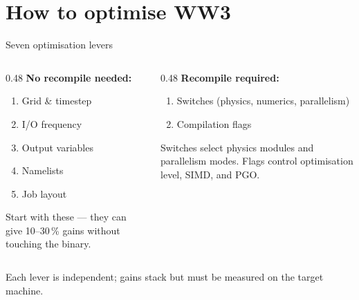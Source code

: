 \documentclass[aspectratio=169,10pt]{beamer}
\begin{document}
\section{How to optimise WW3}

\begin{frame}{Seven optimisation levers}

  \begin{columns}[T]
    \begin{column}{0.48\textwidth}
      \textbf{\color{metnb} No recompile needed:}
      \begin{enumerate}
        \item Grid \& timestep
        \item I/O frequency
        \item Output variables
        \item Namelists
        \item[6.] Job layout
      \end{enumerate}

      \vspace{0.5em}
      \small
      Start with these --- they can give 10--30\,\% gains
      without touching the binary.
    \end{column}
    \begin{column}{0.48\textwidth}
      \textbf{\color{w3org} Recompile required:}
      \begin{enumerate}
        \item[5.] Switches (physics, numerics, parallelism)
        \item[7.] Compilation flags
      \end{enumerate}

      \vspace{0.5em}
      \small
      Switches select physics modules and parallelism modes.
      Flags control optimisation level, SIMD, and PGO.
    \end{column}
  \end{columns}

  \vspace{0.8em}
  \centering\small
  Each lever is independent; gains stack but must be measured on the target machine.
\end{frame}
\end{document}
